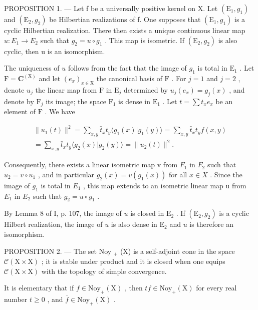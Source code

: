 PROPOSITION 1. --- Let f be a universally positive kernel on X. Let \((\mathrm{E}_{1}, g_{1})\) and \((\mathrm{E}_{2}, g_{2})\) be Hilbertian realizations of f. One supposes that \((\mathrm{E}_{1}, g_{1})\) is a cyclic Hilbertian realization. There then exists a unique continuous linear map \(u: E_{1} \to E_{2}\) such that \(g_{2} = u \circ g_{1}\) . This map is isometric. If \((\mathrm{E}_{2}, g_{2})\) is also cyclic, then u is an isomorphism.

The uniqueness of \(u\) follows from the fact that the image of \(g_{1}\) is total in \(\mathrm{E}_{1}\) . Let \(\mathrm{F} = \mathbf{C}^{(\mathrm{X})}\) and let \((e_x)_{x\in \mathrm{X}}\) the canonical basis of \(\mathrm{F}\) . For \(j = 1\) and \(j = 2\) , denote \(u_{j}\) the linear map from \(\mathrm{F}\) in \(\mathrm{E}_{j}\) determined by \(u_{j}(e_{x}) = g_{j}(x)\) , and denote by \(\mathrm{F}_{j}\) its image; the space \(\mathrm{F}_{1}\) is dense in \(\mathrm{E}_{1}\) . Let \(t = \sum t_{x}e_{x}\) be an element of \(\mathrm{F}\) . We have

\[
\begin{array}{c} \| u _ {1} (t) \| ^ {2} = \sum_ {x, y} \bar {t} _ {x} t _ {y} \langle g _ {1} (x)   |   g _ {1} (y) \rangle = \sum_ {x, y} \bar {t} _ {x} t _ {y} f (x, y) \\ = \sum_ {x, y} \bar {t} _ {x} t _ {y} \langle g _ {2} (x)   |   g _ {2} (y) \rangle = \| u _ {2} (t) \| ^ {2}. \end{array}
\]

Consequently, there exists a linear isometric map v from \(F_{1}\) in \(F_{2}\) such that \(u_{2}=v\circ u_{1}\) , and in particular \(g_{2}(x)=v(g_{1}(x))\) for all \(x\in X\) . Since the image of \(g_{1}\) is total in \(E_{1}\) , this map extends to an isometric linear map u from \(E_{1}\) in \(E_{2}\) such that \(g_{2}=u\circ g_{1}\) .

By Lemma 8 of I, p. 107, the image of \(u\) is closed in \(\mathrm{E}_2\) . If \((\mathrm{E}_2,g_2)\) is a cyclic Hilbert realization, the image of \(u\) is also dense in \(\mathrm{E}_2\) and \(u\) is therefore an isomorphism.

PROPOSITION 2. --- The set Noy \(_{+}\) (X) is a self-adjoint cone in the space \(\mathcal{C}(\text{X} \times \text{X})\) ; it is stable under product and it is closed when one equips \(\mathcal{C}(\text{X} \times \text{X})\) with the topology of simple convergence.

It is elementary that if \(f \in \mathrm{Noy}_{+}(\mathrm{X})\) , then \(tf \in \mathrm{Noy}_{+}(\mathrm{X})\) for every real number \(t \geqslant 0\) , and \(\overline{f} \in \mathrm{Noy}_{+}(\mathrm{X})\) .

